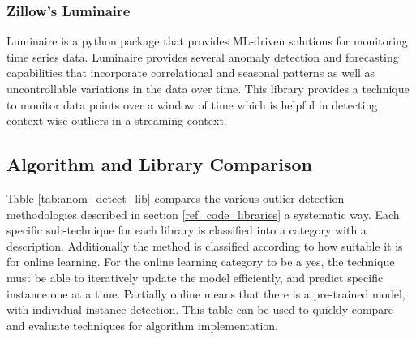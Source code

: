 \subsubsection{Zillow's Luminaire}

Luminaire \cite{chakraborty2020building-luminaire} is a python package that provides ML-driven solutions for monitoring time series data. Luminaire provides several anomaly detection and forecasting capabilities that incorporate correlational and seasonal patterns as well as uncontrollable variations in the data over time. This library provides a technique to monitor data points over a window of time which is helpful in detecting context-wise outliers in a streaming context.

\subsection{Algorithm and Library Comparison}

Table \ref{tab:anom_detect_lib} compares the various outlier detection methodologies described in section \ref{ref_code_libraries} a systematic way. Each specific sub-technique for each library is classified into a category with a description. Additionally the method is classified according to how suitable it is for online learning. For the online learning category to be a yes, the technique must be able to iteratively update the model efficiently, and predict specific instance one at a time. Partially online means that there is a pre-trained model, with individual instance detection. This table can be used to quickly compare and evaluate techniques for algorithm implementation.


